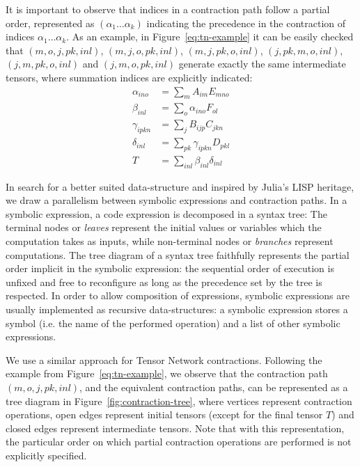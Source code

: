 \documentclass{juliacon}
\begin{document}
It is important to observe that indices in a contraction path follow a partial order, represented as $(\alpha_1 \ldots \alpha_k)$ indicating the precedence in the contraction of indices $\alpha_1 \ldots \alpha_k$. As an example, in Figure~\ref{eq:tn-example} it can be easily checked that $(m,o,j,pk,inl)$, $(m,j,o,pk,inl)$, $(m,j,pk,o,inl)$, $(j,pk,m,o,inl)$, $(j,m,pk,o,inl)$ and $(j,m,o,pk,inl)$ generate exactly the same intermediate tensors, where summation indices are explicitly indicated:
\begin{align*}
\label{eq:contraction-path}
    \alpha_{ino} &= \sum_{m} A_{im} E_{mno} \\
    \beta_{inl} &= \sum_{o} \alpha_{ino} F_{ol}\\
    \gamma_{ipkn} &= \sum_{j} B_{ijp} C_{jkn} \\
    \delta_{inl} &= \sum_{pk} \gamma_{ipkn} D_{pkl}\\
    T &= \sum_{inl} \beta_{inl} \delta_{inl} 
\end{align*} 

In search for a better suited data-structure and inspired by Julia's LISP heritage, we draw a parallelism between symbolic expressions and contraction paths.
In a symbolic expression, a code expression is decomposed in a syntax tree: The terminal nodes or \textit{leaves} represent the initial values or variables which the computation takes as inputs, while non-terminal nodes or \textit{branches} represent computations. The tree diagram of a syntax tree faithfully represents the partial order implicit in the symbolic expression: the sequential order of execution is unfixed and free to reconfigure as long as the precedence set by the tree is respected. In order to allow composition of expressions, symbolic expressions are usually implemented as recursive data-structures: a symbolic expression stores a symbol (i.e. the name of the performed operation) and a list of other symbolic expressions.

We use a similar approach for Tensor Network contractions. Following the example from Figure~\ref{eq:tn-example}, we observe that the contraction path $(m,o,j,pk,inl)$, and the equivalent contraction paths, can be represented as a tree diagram in Figure~\ref{fig:contraction-tree}, where vertices represent contraction operations, open edges represent initial tensors (except for the final tensor $T$) and closed edges represent intermediate tensors. Note that with this representation, the particular order on which partial contraction operations are performed is not explicitly specified.
\end{document}

